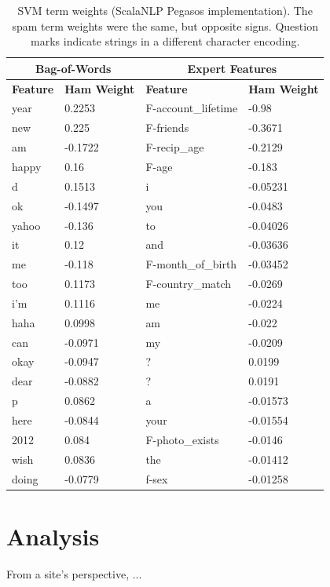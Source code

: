 \documentclass[preprint]{acm_proc_article-sp}
\begin{document}
\begin{table}
\begin{tabular}{l|l||l|l}
\multicolumn{2}{c}{\textbf{Bag-of-Words}} & 
\multicolumn{2}{c}{\textbf{Expert Features}} \\
\hline
\textbf{Feature} & \textbf{Ham Weight} & \textbf{Feature} & \textbf{Ham Weight} \\
\hline

year & 0.2253 & F-account\_lifetime & -0.98\\
new & 0.225 & F-friends & -0.3671\\
am & -0.1722 & F-recip\_age & -0.2129\\
happy & 0.16 & F-age & -0.183\\
d & 0.1513 & i & -0.05231\\
ok & -0.1497 & you & -0.0483\\
yahoo & -0.136 & to & -0.04026\\
it & 0.12 & and & -0.03636\\
me & -0.118 & F-month\_of\_birth & -0.03452\\
too & 0.1173 & F-country\_match & -0.0269\\
i'm & 0.1116 & me & -0.0224\\
haha & 0.0998 & am & -0.022\\
can & -0.0971 & my & -0.0209\\
okay & -0.0947 & ? & 0.0199\\
dear & -0.0882 & ? & 0.0191\\
p & 0.0862 & a & -0.01573\\
here & -0.0844 & your & -0.01554\\
2012 & 0.084 & F-photo\_exists & -0.0146\\
wish & 0.0836 & the & -0.01412\\
doing & -0.0779 & f-sex & -0.01258\\

\end{tabular}
\caption{SVM term weights (ScalaNLP Pegasos implementation). The spam term weights were the same, but opposite signs.
Question marks indicate strings in a different character encoding.}
\label{tab:svmfeats}
\end{table}





\section{Analysis}
From a site's perspective, ...
\end{document}
